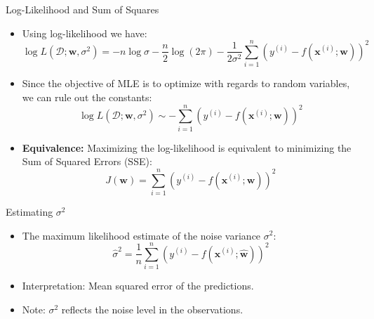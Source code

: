 \documentclass[serif, aspectratio=169]{beamer}
\begin{document}
    \begin{frame}{Log-Likelihood and Sum of Squares}
        \begin{itemize}
            \item Using log-likelihood we have:
            \[
                \log L(\mathcal{D}; \mathbf{w}, \sigma^2) = -n \log \sigma - \frac{n}{2} \log(2\pi) - \frac{1}{2\sigma^2} \sum_{i=1}^n (y^{(i)} - f(\mathbf{x}^{(i)}; \mathbf{w}))^2
            \]
            \item Since the objective of MLE is to optimize with regards to random variables, we can rule out the constants:
            \[
                \log L(\mathcal{D}; \mathbf{w}, \sigma^2) \sim - \sum_{i=1}^n (y^{(i)} - f(\mathbf{x}^{(i)}; \mathbf{w}))^2
            \]
            \item \textbf{Equivalence:} Maximizing the log-likelihood is equivalent to minimizing the Sum of Squared Errors (SSE):
            \[
                J(\mathbf{w}) = \sum_{i=1}^n (y^{(i)} - f(\mathbf{x}^{(i)}; \mathbf{w}))^2
            \]
        \end{itemize}
    \end{frame}

    \begin{frame}{Estimating \( \sigma^2 \)}
        \begin{itemize}
            \item The maximum likelihood estimate of the noise variance \( \sigma^2 \):
            \[
                \hat{\sigma}^2 = \frac{1}{n} \sum_{i=1}^n \left( y^{(i)} - f(\mathbf{x}^{(i)}; \hat{\mathbf{w}}) \right)^2
            \]
            \item Interpretation: Mean squared error of the predictions.
            \item Note: \( \sigma^2 \) reflects the noise level in the observations.
        \end{itemize}
    \end{frame}
\end{document}
